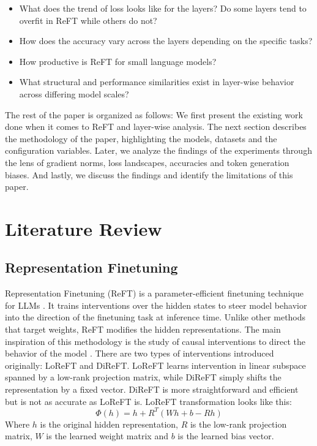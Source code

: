 \documentclass[conference]{IEEEtran}
\begin{document}
	\begin{itemize}
		\item What does the trend of loss looks like for the layers? Do some layers tend to overfit in ReFT while others do not?
		\item How does the accuracy vary across the layers depending on the specific tasks?
		\item How productive is ReFT for small language models?
		\item What structural and performance similarities exist in layer-wise behavior across differing model scales? 
	\end{itemize}
	
	The rest of the paper is organized as follows: We first present the existing work done when it comes to ReFT and layer-wise analysis. The next section describes the methodology of the paper, highlighting the models, datasets and the configuration variables. Later, we analyze the findings of the experiments through the lens of gradient norms, loss landscapes, accuracies and token generation biases. And lastly, we discuss the findings and identify the limitations of this paper.
	
	\section{Literature Review}
	
	\subsection{Representation Finetuning}
	Representation Finetuning (ReFT) is a parameter-efficient finetuning technique for LLMs \cite{wu2024reft}. It trains interventions over the hidden states to steer model behavior into the direction of the finetuning task at inference time. Unlike other methods that target weights, ReFT modifies the hidden representations. The main inspiration of this methodology is the study of causal interventions to direct the behavior of the model \cite{geiger2023causal}. There are two types of interventions introduced originally: LoReFT and DiReFT. LoReFT learns intervention in linear subspace spanned by a low-rank projection matrix, while DiReFT simply shifts the representation by a fixed vector. DiReFT is more straightforward and efficient but is not as accurate as LoReFT is. LoReFT transformation looks like this: 
	$$\Phi(h) = h + R^T (Wh + b - Rh)$$
	Where $h$ is the original hidden representation, $R$ is the low-rank projection matrix, $W$ is the learned weight matrix and $b$ is the learned bias vector.
	
\end{document}
